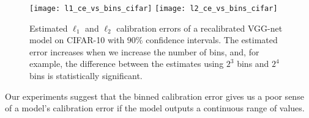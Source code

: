 \begin{figure}
  \centering
  \texttt{[image: l1\_ce\_vs\_bins\_cifar]}
  \texttt{[image: l2\_ce\_vs\_bins\_cifar]}
  \caption{Estimated $\ell_1$ and $\ell_2$ calibration errors of a recalibrated VGG-net model on CIFAR-10 with $90\%$ confidence intervals. The estimated error increases when we increase the number of bins, and, for example, the difference between the estimates using $2^3$ bins and $2^4$ bins is statistically significant.}
  \label{fig:ce_vs_bins}
\end{figure}

Our experiments suggest that the binned calibration error gives us a poor sense of a model's calibration error if the model outputs a continuous range of values.




